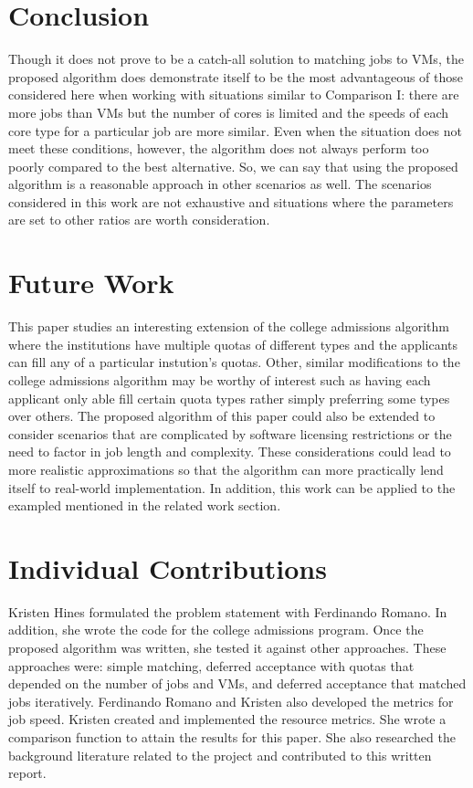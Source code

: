 \documentclass[conference]{IEEEtran}
\begin{document}
\section{Conclusion}
\label{sec:conclusion}
Though it does not prove to be a catch-all solution to matching jobs
to VMs,
the proposed algorithm does demonstrate itself to be the 
most advantageous of those considered here when working with situations
similar to Comparison I: there are more jobs than VMs but the number
of cores is limited and the speeds of each core type for a particular
job are more similar.
Even when the situation does not meet these conditions, however, 
the algorithm does not always perform too poorly compared to the best alternative.
So, we can say that using the proposed algorithm is a reasonable 
approach in other scenarios as well. 
The scenarios considered in this work are not exhaustive 
and situations where the parameters are set to other ratios 
are worth consideration.



\section{Future Work}
\label{sec:future}
This paper studies an interesting extension of the college admissions
algorithm where the institutions have multiple quotas of different types
and the applicants can fill any of a particular instution's quotas.
Other, similar modifications to the college admissions algorithm 
may be worthy of interest such as having each applicant only able fill certain 
quota types rather 
simply preferring some types over others.
The proposed algorithm of this paper could also be extended to consider 
scenarios that are complicated by software licensing restrictions
or the need to factor in job length and complexity.
These considerations could lead to more realistic approximations 
so that the algorithm can more practically lend itself to 
real-world implementation.  In addition, this work can
be applied to the exampled mentioned in the related work
section.

\section{Individual Contributions}
Kristen Hines formulated the problem statement with 
Ferdinando Romano.  In addition, 
she wrote the code for the college admissions program.  Once the 
proposed algorithm was written, she tested it against other 
approaches.  These approaches were: simple matching,
deferred acceptance with quotas that depended on the 
number of jobs and VMs, and deferred acceptance that 
matched jobs iteratively.  Ferdinando Romano and Kristen
also developed the metrics for job speed.  Kristen created 
and implemented the resource metrics.  She wrote 
a comparison function
to attain the results for this paper.  She also researched 
the background literature related to the 
project and contributed to this written report.
\end{document}
